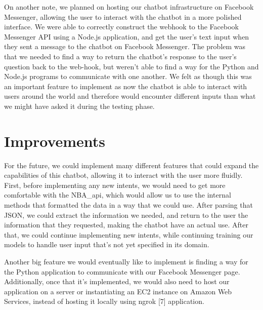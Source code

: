 \documentclass[conference]{IEEEtran}
\begin{document}
On another note, we planned on hosting our chatbot infrastructure on Facebook Messenger, allowing the user to interact with the chatbot in a more polished interface. We were able to correctly construct the webhook to the Facebook Messenger API using a Node.js application, and get the user's text input when they sent a message to the chatbot on Facebook Messenger. The problem was that we needed to find a way to return the chatbot's response to the user's question back to the web-hook, but weren't able to find a way for the Python and Node.js programs to communicate with one another. We felt as though this was an important feature to implement as now the chatbot is able to interact with users around the world and therefore would encounter different inputs than what we might have asked it during the testing phase.

\section*{Improvements}
For the future, we could implement many different features that could expand the capabilities of this chatbot, allowing it to interact with the user more fluidly. First, before implementing any new intents, we would need to get more comfortable with the NBA\_api, which would allow us to use the internal methods that formatted the data in a way that we could use. After parsing that JSON, we could extract the information we needed, and return to the user the information that they requested, making the chatbot have an actual use. After that, we could continue implementing new intents, while continuing training our models to handle user input that's not yet specified in its domain.

Another big feature we would eventually like to implement is finding a way for the Python application to communicate with our Facebook Messenger page. Additionally, once that it's implemented, we would also need to host our application on a server or instantiating an EC2 instance on Amazon Web Services, instead of hosting it locally using ngrok [7] application. 
\end{document}

